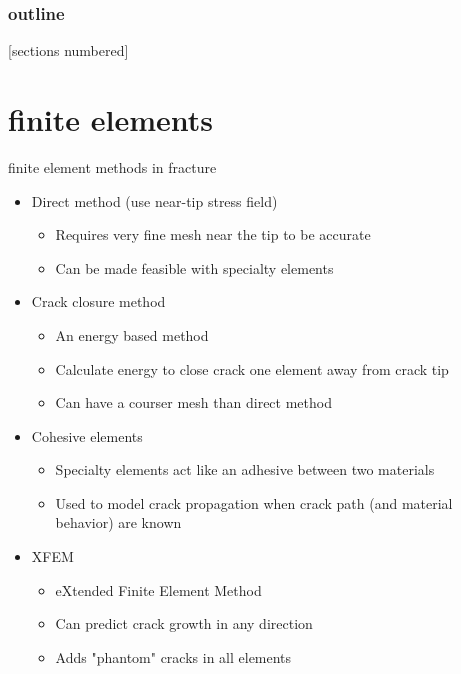 \documentclass[10pt]{beamer}
\begin{document}
	\begin{frame}
		\frametitle{outline}
		[sections numbered]
		\tableofcontents[hideallsubsections]
	\end{frame}

	\section{finite elements}
	
	\begin{frame}{finite element methods in fracture}
		\begin{itemize}[<+->]
			\item Direct method (use near-tip stress field)
			\begin{itemize}
				\item Requires very fine mesh near the tip to be accurate
				\item Can be made feasible with specialty elements
			\end{itemize}
			\item Crack closure method
			\begin{itemize}
				\item An energy based method
				\item Calculate energy to close crack one element away from crack tip
				\item Can have a courser mesh than direct method
			\end{itemize}
			\item Cohesive elements
			\begin{itemize}
				\item Specialty elements act like an adhesive between two materials
				\item Used to model crack propagation when crack path (and material behavior) are known
			\end{itemize}
			\item XFEM
			\begin{itemize}
				\item eXtended Finite Element Method
				\item Can predict crack growth in any direction
				\item Adds "phantom" cracks in all elements
			\end{itemize}
		\end{itemize}
	\end{frame}
	
\end{document}
